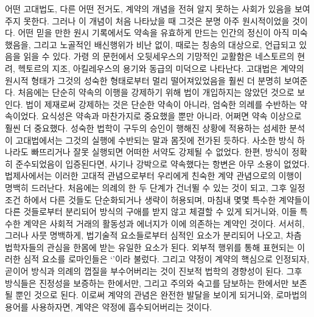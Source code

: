 어떤 고대법도, 다른 어떤 전거도,
계약의 개념을 전혀 알지 못하는 사회가 있음을 보여주지 못한다.
그러나 이 개념이 처음 나타났을 때
그것은 분명 아주 원시적이었을 것이다.
어떤 믿을 만한 원시 기록에서도
약속을 유효하게 만드는 인간의 정신이 아직 미숙했음을,
그리고
노골적인 배신행위가 비난 없이, 때로는 칭송의 대상으로, 언급되고 있음을
읽을  수 있다.
가령 의 문헌에서
오뒷세우스의 기망적인 교활함은
네스토르의 현려, 헥토르의 지조,
아킬레우스의 용기와 동급의 미덕으로 나타난다.
고대법은 계약의 원시적 형태가 그것의 성숙한 형태로부터
멀리 떨어져있었음을 훨씬 더 분명히 보여준다.
처음에는 단순히 약속의 이행을 강제하기 위해
법이 개입하지는 않았던 것으로 보인다.
법이 제재로써 강제하는 것은 단순한 약속이 아니라,
엄숙한 의례를 수반하는 약속이었다.
요식성은 약속과 마찬가지로 중요했을 뿐만 아니라,
어쩌면 약속 이상으로 훨씬 더 중요했다.
성숙한 법학이 구두의 승인이 행해진 상황에 적용하는
섬세한 분석이
고대법에서는
그것의 실행에 수반되는 말과 몸짓에 전가된 듯하다.
사소한 방식 하나라도 빠뜨리거나 잘못 실행되면 어떠한 서약도
강제될 수 없었다.
한편, 방식이 정확히 준수되었음이 입증된다면,
사기나 강박으로 약속했다는 항변은 아무 소용이 없었다.
법제사에서는
이러한 고대적 관념으로부터 우리에게 친숙한 계약 관념으로의 이행이
명백히 드러난다.
처음에는 의례의 한 두 단계가 건너뛸 수 있는 것이 되고,
그후 일정 조건 하에서 다른 것들도 단순화되거나 생략이 허용되며,
마침내 몇몇 특수한 계약들이 다른 것들로부터 분리되어
방식의 구애를 받지 않고 체결할 수 있게 되거니와,
이들 특수한 계약은
사회적 거래의 활동성과 에너지가
이에
의존하는 계약인 것이다.
서서히, 그러나 사뭇 명백하게,
법기술적 요소들로부터 심적인 요소가 분리되어 나오고,
차츰 법학자들의 관심을 한몸에 받는 유일한 요소가 된다.
외부적 행위를 통해 표현되는
이러한 심적 요소를 로마인들은
`'이라 불렀다.
그리고 약정이 계약의 핵심으로 인정되자,
곧이어
방식과 의례의 껍질을 부수어버리는 것이
진보적 법학의 경향성이 된다.
그후 방식들은 진정성을 보증하는 한에서만,
그리고 주의와 숙고를 담보하는 한에서만
보존될 뿐인 것으로 된다.
이로써 계약의 관념은 완전한 발달을 보이게 되거니와,
로마법의 용어를 사용하자면,
계약은 약정에 흡수되어버리는 것이다.

